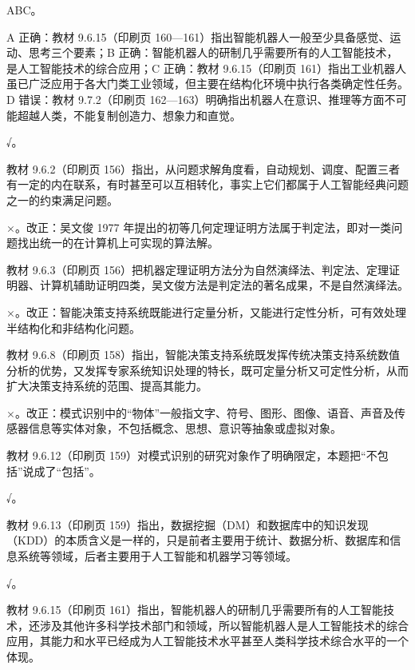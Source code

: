 \documentclass[a4paper,11pt]{article}
\begin{document}
\q ABC。\begin{analysis}A 正确：教材 9.6.15（印刷页 160—161）指出智能机器人一般至少具备感觉、运动、思考三个要素；B 正确：智能机器人的研制几乎需要所有的人工智能技术，是人工智能技术的综合应用；C 正确：教材 9.6.15（印刷页 161）指出工业机器人虽已广泛应用于各大门类工业领域，但主要在结构化环境中执行各类确定性任务。D 错误：教材 9.7.2（印刷页 162—163）明确指出机器人在意识、推理等方面不可能超越人类，不能复制创造力、想象力和直觉。\end{analysis}


\q √。\begin{analysis}教材 9.6.2（印刷页 156）指出，从问题求解角度看，自动规划、调度、配置三者有一定的内在联系，有时甚至可以互相转化，事实上它们都属于人工智能经典问题之一的约束满足问题。\end{analysis}

\q ×。改正：吴文俊 1977 年提出的初等几何定理证明方法属于判定法，即对一类问题找出统一的在计算机上可实现的算法解。\begin{analysis}教材 9.6.3（印刷页 156）把机器定理证明方法分为自然演绎法、判定法、定理证明器、计算机辅助证明四类，吴文俊方法是判定法的著名成果，不是自然演绎法。\end{analysis}

\q ×。改正：智能决策支持系统既能进行定量分析，又能进行定性分析，可有效处理半结构化和非结构化问题。\begin{analysis}教材 9.6.8（印刷页 158）指出，智能决策支持系统既发挥传统决策支持系统数值分析的优势，又发挥专家系统知识处理的特长，既可定量分析又可定性分析，从而扩大决策支持系统的范围、提高其能力。\end{analysis}

\q ×。改正：模式识别中的“物体”一般指文字、符号、图形、图像、语音、声音及传感器信息等实体对象，不包括概念、思想、意识等抽象或虚拟对象。\begin{analysis}教材 9.6.12（印刷页 159）对模式识别的研究对象作了明确限定，本题把“不包括”说成了“包括”。\end{analysis}

\q √。\begin{analysis}教材 9.6.13（印刷页 159）指出，数据挖掘（DM）和数据库中的知识发现（KDD）的本质含义是一样的，只是前者主要用于统计、数据分析、数据库和信息系统等领域，后者主要用于人工智能和机器学习等领域。\end{analysis}

\q √。\begin{analysis}教材 9.6.15（印刷页 161）指出，智能机器人的研制几乎需要所有的人工智能技术，还涉及其他许多科学技术部门和领域，所以智能机器人是人工智能技术的综合应用，其能力和水平已经成为人工智能技术水平甚至人类科学技术综合水平的一个体现。\end{analysis}
\end{document}
